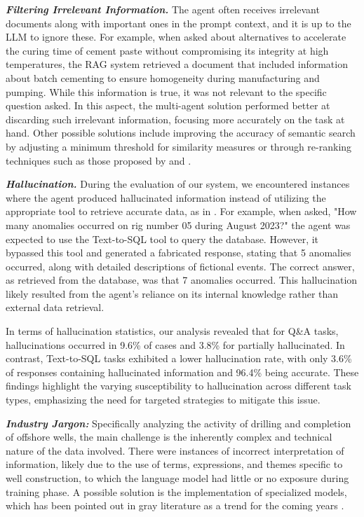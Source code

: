             \setlength{\parindent}{1em}
            \textbf{\textit{Filtering Irrelevant Information.}} 
                The agent often receives irrelevant documents along with important ones in the prompt context, and it is up to the LLM to ignore these. For example, when asked about alternatives to accelerate the curing time of cement paste without compromising its integrity at high temperatures, the RAG system retrieved a document that included information about batch cementing to ensure homogeneity during manufacturing and pumping. While this information is true, it was not relevant to the specific question asked. In this aspect, the multi-agent solution performed better at discarding such irrelevant information, focusing more accurately on the task at hand. Other possible solutions include improving the accuracy of semantic search by adjusting a minimum threshold for similarity measures or through re-ranking techniques such as those proposed by \cite{Carraro2024} and \cite{Sun2023}.
            
            \setlength{\parindent}{1em}
            \textbf{\textit{Hallucination.}} 
                During the evaluation of our system, we encountered instances where the agent produced hallucinated information instead of utilizing the appropriate tool to retrieve accurate data, as in \cite{Bilbao2023}. For example, when asked, "How many anomalies occurred on rig number 05 during August 2023?" the agent was expected to use the Text-to-SQL tool to query the database. However, it bypassed this tool and generated a fabricated response, stating that 5 anomalies occurred, along with detailed descriptions of fictional events. The correct answer, as retrieved from the database, was that 7 anomalies occurred. This hallucination likely resulted from the agent's reliance on its internal knowledge rather than external data retrieval. 

                In terms of hallucination statistics, our analysis revealed that for Q\&A tasks, hallucinations occurred in 9.6\% of cases and 3.8\% for partially hallucinated. In contrast, Text-to-SQL tasks exhibited a lower hallucination rate, with only 3.6\% of responses containing hallucinated information and 96.4\% being accurate. These findings highlight the varying susceptibility to hallucination across different task types, emphasizing the need for targeted strategies to mitigate this issue.
            
            \setlength{\parindent}{1em}
            \textbf{\textit{Industry Jargon:}}
                Specifically analyzing the activity of drilling and completion of offshore wells, the main challenge is the inherently complex and technical nature of the data involved. 
                There were instances of incorrect interpretation of information, likely due to the use of terms, expressions, and themes specific to well construction, to which the language model had little or no exposure during training phase. 
                A possible solution is the implementation of specialized models, which has been pointed out in gray literature as a trend for the coming years \cite{Shah2024, Meena2023, Ghosh2023}.
            
